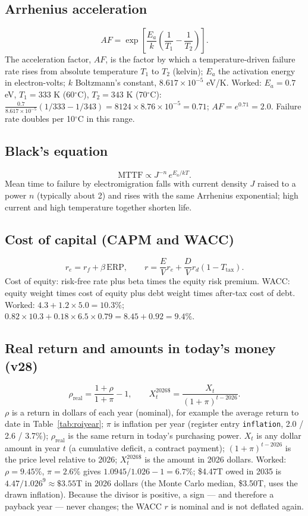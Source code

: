 \documentclass[11pt,letterpaper]{article}
\begin{document}
\subsection*{Arrhenius acceleration}
\[AF=\exp\!\left[\frac{E_a}{k}\left(\frac{1}{T_1}-\frac{1}{T_2}\right)\right].\]
The acceleration factor, $AF$, is the factor by which a temperature-driven failure rate rises from absolute temperature $T_1$ to $T_2$ (kelvin); $E_a$ the activation energy in electron-volts; $k$ Boltzmann's constant, $8.617\times10^{-5}$ eV/K. Worked: $E_a=0.7$ eV, $T_1=333$ K (60$^{\circ}$C), $T_2=343$ K (70$^{\circ}$C): $\frac{0.7}{8.617\times10^{-5}}(1/333-1/343)=8124\times8.76\times10^{-5}=0.71$; $AF=e^{0.71}=2.0$. Failure rate doubles per 10$^{\circ}$C in this range.

\subsection*{Black's equation}
\[\text{MTTF}\propto J^{-n}\,e^{E_a/kT}.\]
Mean time to failure by electromigration falls with current density $J$ raised to a power $n$ (typically about 2) and rises with the same Arrhenius exponential; high current and high temperature together shorten life.

\subsection*{Cost of capital (CAPM and WACC)}
\[r_e=r_f+\beta\,\text{ERP},\qquad r=\frac{E}{V}r_e+\frac{D}{V}r_d(1-T_{\text{tax}}).\]
Cost of equity: risk-free rate plus beta times the equity risk premium. WACC: equity weight times cost of equity plus debt weight times after-tax cost of debt. Worked: $4.3+1.2\times5.0=10.3\%$; $0.82\times10.3+0.18\times6.5\times0.79=8.45+0.92=9.4\%$.

\subsection*{Real return and amounts in today's money (v28)}
\[\rho_{\text{real}}=\frac{1+\rho}{1+\pi}-1,\qquad X^{\text{2026\$}}_t=\frac{X_t}{(1+\pi)^{t-2026}}.\]
$\rho$ is a return in dollars of each year (nominal), for example the average return to date in Table~\ref{tab:roiyear}; $\pi$ is inflation per year (register entry \texttt{inflation}, 2.0 / 2.6 / 3.7\%); $\rho_{\text{real}}$ is the same return in today's purchasing power. $X_t$ is any dollar amount in year $t$ (a cumulative deficit, a contract payment); $(1+\pi)^{t-2026}$ is the price level relative to 2026; $X^{\text{2026\$}}_t$ is the amount in 2026 dollars. Worked: $\rho=9.45\%$, $\pi=2.6\%$ gives $1.0945/1.026-1=6.7\%$; \$4.47T owed in 2035 is $4.47/1.026^{9}\approx\$3.55$T in 2026 dollars (the Monte Carlo median, \$3.50T, uses the drawn inflation). Because the divisor is positive, a sign --- and therefore a payback year --- never changes; the WACC $r$ is nominal and is not deflated again.
\end{document}
